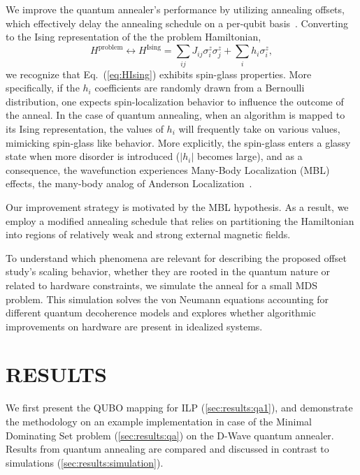 \documentclass[prd,twocolumn,tightenlines,preprintnumbers,showpacs,superscriptaddress,notitlepage,nofootinbib,eqsecnum,floatfix,longbibliography,aps,10pt]{revtex4-2}
\begin{document}
We improve the quantum annealer's performance by utilizing annealing offsets, which effectively delay the annealing schedule on a per-qubit basis~\cite{PhysRevA.96.042322,hsu2018quantum,10.1007/978-3-030-14082-3_14}.
Converting to the Ising representation of the the problem Hamiltonian,
\begin{equation}
    \label{eq:HIsing}
     H^{\textrm{problem}} \leftrightarrow H^{\textrm{Ising}} = \sum_{ij} J_{ij} \sigma^z_i \sigma^z_j + \sum_i h_i \sigma^z_i ,
\end{equation}
we recognize that Eq.~(\ref{eq:HIsing}) exhibits spin-glass properties. More specifically, if the $h_i$ coefficients are randomly drawn from a Bernoulli distribution, one expects spin-localization behavior to influence the outcome of the anneal.
In the case of quantum annealing, when an algorithm is mapped to its Ising representation, the values of $h_i$ will frequently take on various values, mimicking spin-glass like behavior.
More explicitly, the spin-glass enters a glassy state when more disorder is introduced ($|h_i|$ becomes large), and as a consequence, the wavefunction experiences Many-Body Localization (MBL) effects, the many-body analog of Anderson Localization~\cite{doi:10.1146/annurev-conmatphys-031214-014726,PhysRevE.90.022103,RevModPhys.91.021001,ALET2018498,PhysRevB.82.174411,PhysRevLett.109.017202}.

Our improvement strategy is motivated by the MBL hypothesis.
As a result, we employ a modified annealing schedule that relies on partitioning the Hamiltonian into regions of relatively weak and strong external magnetic fields.


To understand which phenomena are relevant for describing the proposed offset study's scaling behavior, whether they are rooted in the quantum nature or related to hardware constraints, we simulate the anneal for a small MDS problem. This simulation solves the von Neumann equations accounting for different quantum decoherence models and explores whether algorithmic improvements on hardware are present in idealized systems.

\section{RESULTS}
\label{sec:results}

We first present the QUBO mapping for ILP (\ref{sec:results:qa1}), and demonstrate the methodology on an example implementation in case of the Minimal Dominating Set problem (\ref{sec:results:qa}) on the D-Wave quantum annealer. Results from quantum annealing are compared and discussed in contrast to simulations (\ref{sec:results:simulation}).
\end{document}

